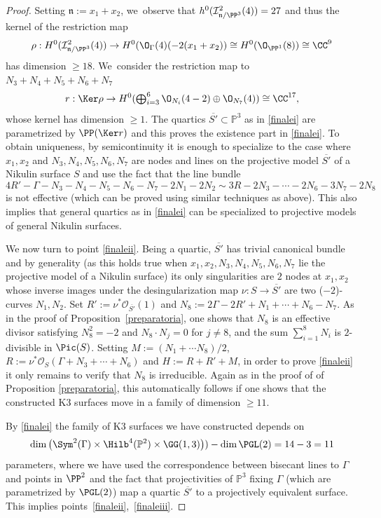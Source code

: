\begin{proof}
Setting $\mathfrak n:=x_1+x_2$, we~observe that $h^0(\mathcal I^2_{\mathfrak{n}/\PP^3}(4))=27$ and thus the kernel of the
restriction map
\begin{equation}\label{forza}
\rho: H^0(\mathcal I^2_{\mathfrak{n}/\PP^3}(4)) \to
H^0(\mathcal \O_{\Gamma}(4)(-2(x_1+x_2))\cong H^0(\O_{\PP^1}(8)) \cong \CC^9
\end{equation}
has dimension $\geq 18$. We~consider the restriction map to $N_3+N_4+N_5+N_6+N_7$
\begin{equation}\label{roma}
r: \Ker \rho \to H^0(\textstyle\bigoplus_{i=3}^6 \O_{N_i}(4-2)\oplus \O_{N_7}(4))\cong \CC^{17},
\end{equation}
whose kernel has dimension $\geq 1$. The quartics $\overline{S'}\subset\mathbb P^3$ as in \eqref{finalei} are parametrized by $\PP(\Ker r)$ and this proves the existence part in \eqref{finalei}. To obtain uniqueness, by semicontinuity it is enough to specialize to the case where $x_1,x_2$ and $N_3,N_4,N_5,N_6,N_7$ are nodes and lines on the projective model $\overline{S'}$ of a Nikulin surface $S$ and use the fact that the line bundle
\[
4R'-\Gamma-N_3-N_4-N_5-N_6-N_7-2N_1-2N_2 \sim 3R-2N_3-\cdots-2N_6-3N_7-2N_8
\]
is not effective (which can be proved using similar techniques as above). This also implies that general quartics as in \eqref{finalei} can be specialized to projective models of general Nikulin surfaces.

We now turn to point \eqref{finaleii}. Being a quartic, $\overline{S'}$ has trivial canonical bundle and by generality (as this holds true when $x_1,x_2,N_3,N_4,N_5,N_6,N_7$ lie the projective model of a Nikulin surface) its only singularities are $2$ nodes at $x_1,x_2$ whose inverse images under the desingularization map $\nu:S\to\overline{S'}$ are two ($-2$)-curves $N_1,N_2$. Set $R':=\nu^*\mathcal O_{\overline{S'}}(1)$ and $N_8:=2\Gamma-2R'+N_1+\cdots +N_6-N_7$. As in the proof of Proposition~\ref{preparatoria}, one shows that $N_8$ is an effective divisor satisfying $N_8^2=-2$ and $N_8\cdot N_j=0$ for $j\neq 8$, and the sum $\sum_{i=1}^8N_i$ is $2$-divisible in $\Pic(S)$. Setting $M:=(N_1+\cdots N_8)/2$, $R:=\nu^*\mathcal{O}_{ S}(\Gamma+N_3+\cdots+N_6)$ and $H:=R+R'+M$, in order to prove \eqref{finaleii} it only remains to verify that $N_8$ is irreducible. Again as in the proof of of Proposition \ref{preparatoria}, this automatically follows if one shows that the constructed K3 surfaces move in a family of dimension $\geq11$.

By \eqref{finalei} the family of K3 surfaces we have constructed depends on
\[
\dim\left(\Sym ^2(\Gamma)\times \Hilb^4(\mathbb P^2)\times \GG(1,3)\right))-\dim \PGL(2)=14-3=11
\]
parameters, where we have used the correspondence between bisecant lines to $\Gamma$ and points in $\PP^2$ and the fact that projectivities of $\mathbb P^3$ fixing $\Gamma$ (which are parametrized by $\PGL(2)$) map a quartic $\overline{S'}$ to a projectively equivalent surface. This implies points~\eqref{finaleii},~\eqref{finaleiii}.
\end{proof}


